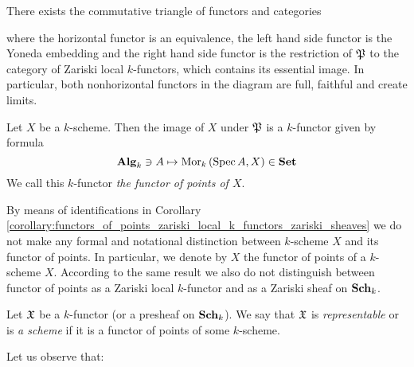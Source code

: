 \begin{corollary}\label{corollary:functors_of_points_zariski_local_k_functors_zariski_sheaves}
There exists the commutative triangle of functors and categories
\begin{center}
\end{center}
where the horizontal functor is an equivalence, the left hand side functor is the Yoneda embedding and the right hand side functor is the restriction of ${\mathfrak P}$ to the category of Zariski local $k$-functors, which contains its essential image. In particular, both nonhorizontal functors in the diagram are full, faithful and create limits.
\end{corollary}

\begin{definition}
Let $X$ be a $k$-scheme. Then the image of $X$ under ${\mathfrak P}$ is a $k$-functor given by formula
$$\mathbf{Alg}_k\ni A \mapsto \mathrm{Mor}_k\left(\mathrm{Spec}\, A,X\right) \in \mathbf{Set}$$
We call this $k$-functor \textit{the functor of points of $X$}.
\end{definition}

\begin{remark}\label{remark:functors_of_points}
By means of identifications in Corollary \ref{corollary:functors_of_points_zariski_local_k_functors_zariski_sheaves} we do not make any formal and notational distinction between $k$-scheme $X$ and its functor of points. In particular, we denote by $X$ the functor of points of a $k$-scheme $X$. According to the same result we also do not distinguish between functor of points as a Zariski local $k$-functor and as a Zariski sheaf on $\mathbf{Sch}_k$.
\end{remark}

\begin{definition}
Let ${\mathfrak X}$ be a $k$-functor (or a presheaf on $\mathbf{Sch}_k$). We say that ${\mathfrak X}$ is \textit{representable} or is \textit{a scheme} if it is a functor of points of some $k$-scheme.
\end{definition}
\noindent
Let us observe that:

